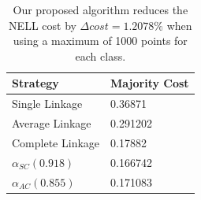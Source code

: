 \begin{table}[h]
    \centering
    \begin{tabular}{|l | l|}
    \hline
    Strategy & Majority Cost\\ \hline
    Single Linkage & 0.36871\\
    Average Linkage & 0.291202\\
    Complete Linkage & 0.17882\\
    $\alpha_{SC}(0.918)$ & 0.166742\\
    $\alpha_{AC}(0.855)$ & 0.171083\\\hline
    \end{tabular}
    \caption{Our proposed algorithm reduces the NELL cost by $\Delta cost = 1.2078\%$ when using a maximum of 1000 points for each class.}
    \label{table:nell1000}
\end{table}

